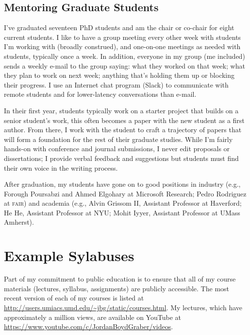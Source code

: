 \documentclass[11pt]{amsart}
\newcommand{\abr}[1]{\textsc{#1}}
\begin{document}
\subsection{Mentoring Graduate Students}

I've graduated seventeen PhD students and am the chair or co-chair for
eight current students.  I like to have a group meeting every other
week with students I'm working with (broadly construed), and
one-on-one meetings as needed with students, typically once a week. In
addition, everyone in my group (me included) sends a weekly e-mail to
the group saying: what they worked on that week; what they plan to work
on next week; anything that's holding them up or blocking their
progress. I use an Internet chat program (Slack) to communicate with remote
students and for lower-latency conversations than e-mail.

In their first year, students typically work on a starter project that
builds on a senior student's work, this often becomes a paper with the
new student as a first author.  From there, I work with the student to
craft a trajectory of papers that will form a foundation for the rest
of their graduate studies.  While I'm fairly hands-on with conference
and journal submissions, I never edit proposals or dissertations; I
provide verbal feedback and suggestions but students must find their
own voice in the writing process.

After graduation, my students have gone on to good positions in
industry (e.g., Forough Poursabzi and Ahmed Elgohary at Microsoft
Research; Pedro Rodriguez at \abr{fair}) and academia (e.g., Alvin
Grissom II, Assistant Professor at Haverford; He He, Assistant
Professor at NYU; Mohit Iyyer, Assistant Professor at UMass Amherst).

\section{Example Sylabuses}

Part of my commitment to public education is to ensure that all of my
course materials (lectures, syllabus, assignments) are publicly
accessible. The most recent version of each of my courses is listed at
\url{http://users.umiacs.umd.edu/~jbg/static/courses.html}.  My
lectures, which have approximately a million views, are available on
YouTube at \url{https://www.youtube.com/c/JordanBoydGraber/videos}.

\end{document}
